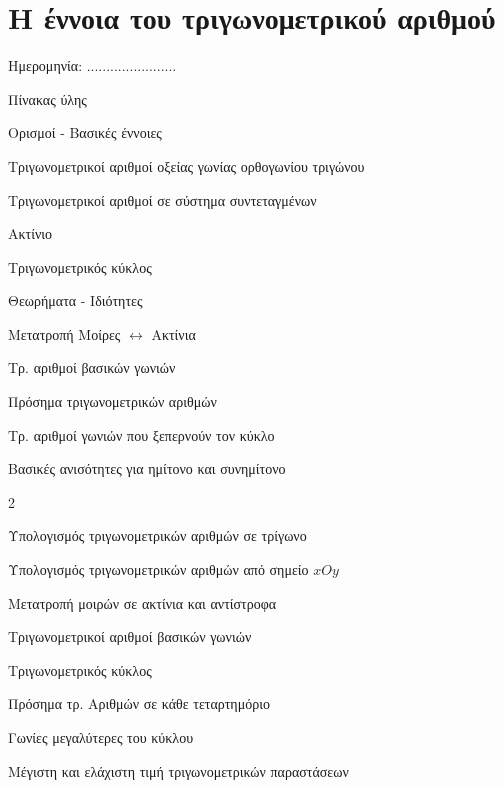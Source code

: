 \documentclass[twoside,nofonts,internet,math,spyros]{frontisthrio}
\newcommand{\myitem}{\stepcounter{enumi}\item[\raisebox{0.5mm}{\faEdit}\ \Large$\square$]}
\begin{document}
\newpage
\section{Η έννοια του τριγωνομετρικού αριθμού}
\begin{flushright}
\faCalendar* Ημερομηνία: .......................
\end{flushright}
\begin{mybox}[mysubtitle]{Πίνακας ύλης}
\begin{tcbraster}[raster columns=2,raster equal height]
\begin{myleftbox}{Ορισμοί - Βασικές έννοιες\ \ \faBook}
\begin{arithmisi}[itemsep=0mm]
\item Τριγωνομετρικοί αριθμοί οξείας γωνίας ορθογωνίου τριγώνου
\item Τριγωνομετρικοί αριθμοί σε σύστημα συντεταγμένων
\item Ακτίνιο
\item Τριγωνομετρικός κύκλος
\end{arithmisi}
\end{myleftbox}
\begin{myrightbox}{Θεωρήματα - Ιδιότητες\ \ \faTools}
\begin{arithmisi}[itemsep=0mm]
\item Μετατροπή Μοίρες $ \leftrightarrow $ Ακτίνια
\item Τρ. αριθμοί βασικών γωνιών
\item Πρόσημα τριγωνομετρικών αριθμών
\item Τρ. αριθμοί γωνιών που ξεπερνούν τον κύκλο
\item Βασικές ανισότητες για ημίτονο και συνημίτονο
\end{arithmisi}
\end{myrightbox}
\end{tcbraster}
\begin{multicols}{2}
\begin{todolist}[itemsep=0mm]
\myitem Υπολογισμός τριγωνομετρικών αριθμών σε τρίγωνο
\item Υπολογισμός τριγωνομετρικών αριθμών από σημείο $ xOy $
\item Μετατροπή μοιρών σε ακτίνια και αντίστροφα
\myitem Τριγωνομετρικοί αριθμοί βασικών γωνιών
\item Τριγωνομετρικός κύκλος
\myitem Πρόσημα τρ. Αριθμών σε κάθε τεταρτημόριο
\item Γωνίες μεγαλύτερες του κύκλου
\item Μέγιστη και ελάχιστη τιμή τριγωνομετρικών παραστάσεων

\end{todolist}
\end{multicols}
\end{mybox}
\end{document}
